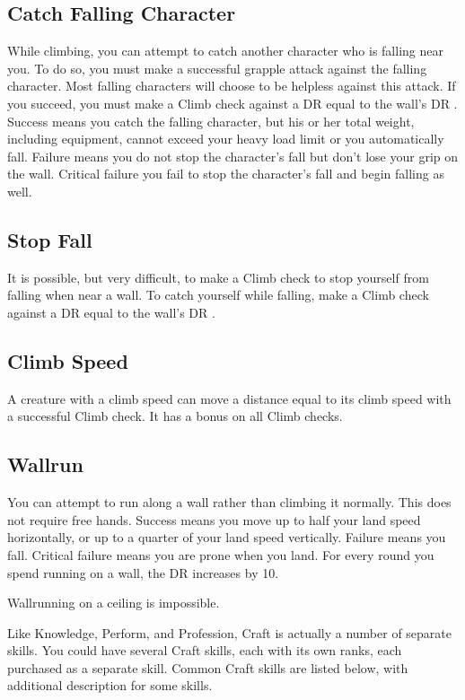    \subsection{Catch Falling Character}
        While climbing, you can attempt to catch another character who is falling near you. To do so, you must make a successful grapple attack against the falling character. Most falling characters will choose to be helpless against this attack. If you succeed, you must make a Climb check against a DR equal to the wall's DR . Success means you catch the falling character, but his or her total weight, including equipment, cannot exceed your heavy load limit or you automatically fall. Failure means you do not stop the character's fall but don't lose your grip on the wall. Critical failure you fail to stop the character's fall and begin falling as well.

    \subsection{Stop Fall}
        It is possible, but very difficult, to make a Climb check to stop yourself from falling when near a wall. To catch yourself while falling, make a Climb check against a DR equal to the wall's DR .

    \subsection{Climb Speed}\label{Climb Speed}
        A creature with a climb speed can move a distance equal to its climb speed with a successful Climb check.
        It has a  bonus on all Climb checks.

    \subsection{Wallrun}
        You can attempt to run along a wall rather than climbing it normally. This does not require free hands. Success means you move up to half your land speed horizontally, or up to a quarter of your land speed vertically. Failure means you fall. Critical failure means you are prone when you land. For every round you spend running on a wall, the DR increases by 10.

        Wallrunning on a ceiling is impossible.

        Like Knowledge, Perform, and Profession, Craft is actually a number of separate skills. You could have several Craft skills, each with its own ranks, each purchased as a separate skill. Common Craft skills are listed below, with additional description for some skills.

